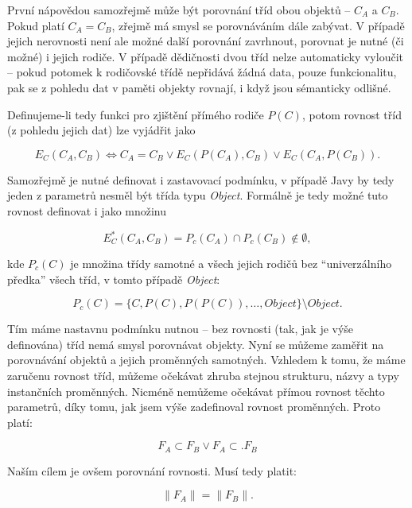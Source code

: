 První nápovědou samozřejmě může být porovnání tříd obou objektů -- $C_A$ a $C_B$. Pokud platí $C_A = C_B$, zřejmě má smysl se porovnáváním dále zabývat. V případě jejich nerovnosti není ale možné další porovnání zavrhnout, porovnat je nutné (či možné) i jejich rodiče. V případě dědičnosti dvou tříd nelze automaticky vyloučit -- pokud potomek k rodičovské třídě nepřidává žádná data, pouze funkcionalitu, pak se z pohledu dat v paměti objekty rovnají, i když jsou sémanticky odlišné.

Definujeme-li tedy funkci pro zjištění přímého rodiče $P(C)$, potom rovnost tříd (z pohledu jejich dat) lze vyjádřit jako

\begin{equation}
    E_C(C_A, C_B) \Leftrightarrow C_A = C_B \vee E_C(P(C_A), C_B) \vee E_C(C_A, P(C_B)).   
\end{equation}

Samozřejmě je nutné definovat i zastavovací podmínku, v případě Javy by tedy jeden z parametrů nesměl být třída typu \textit{Object}. Formálně je tedy možné tuto rovnost definovat i jako množinu

\begin{equation}
E_C^{*}(C_A, C_B)= P_c(C_A) \cap P_c(C_B) \notin \emptyset,
\end{equation}

kde $P_c(C)$ je množina třídy samotné a všech jejich rodičů bez “univerzálního předka” všech tříd, v tomto případě \textit{Object}:

\begin{equation}
P_c(C) = \{C, P(C), P(P(C)), \dots, Object\} \setminus Object.
\end{equation}

Tím máme nastavnu podmínku nutnou -- bez rovnosti (tak, jak je výše definována) tříd nemá smysl porovnávat objekty. Nyní se můžeme zaměřit na porovnávání objektů a jejich proměnných samotných. Vzhledem k tomu, že máme zaručenu rovnost tříd, můžeme očekávat zhruba stejnou strukturu, názvy a typy instančních proměnných. Nicméně nemůžeme očekávat přímou rovnost těchto parametrů, díky tomu, jak jsem výše zadefinoval rovnost proměnných. Proto platí:

\begin{equation}
F_A \subset F_B \vee F_A \subset. F_B 
\end{equation}

Naším cílem je ovšem porovnání rovnosti. Musí tedy platit:

\begin{equation}
\|F_A\| = \|F_B\|.
\end{equation}

